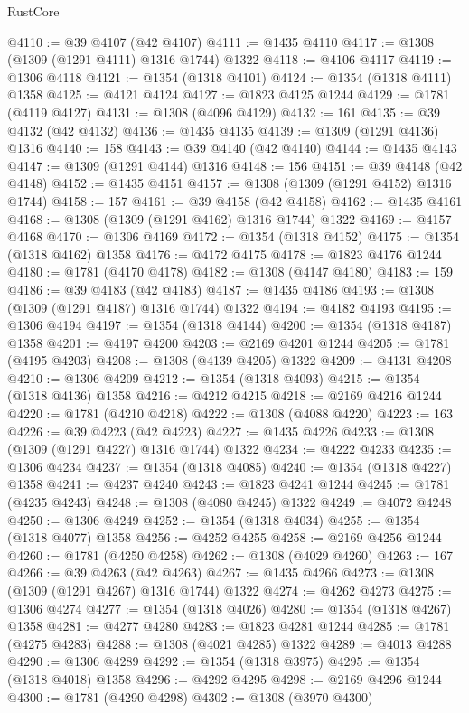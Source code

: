 \begin{lexlean}{RustCore}
\begin{coremodule}
@4110 := @39 @4107 (@42 @4107)
@4111 := @1435 @4110
@4117 := @1308 (@1309 (@1291 @4111) @1316 @1744) @1322
@4118 := @4106 @4117
@4119 := @1306 @4118
@4121 := @1354 (@1318 @4101)
@4124 := @1354 (@1318 @4111) @1358
@4125 := @4121 @4124
@4127 := @1823 @4125 @1244
@4129 := @1781 (@4119 @4127)
@4131 := @1308 (@4096 @4129)
@4132 := 161
@4135 := @39 @4132 (@42 @4132)
@4136 := @1435 @4135
@4139 := @1309 (@1291 @4136) @1316
@4140 := 158
@4143 := @39 @4140 (@42 @4140)
@4144 := @1435 @4143
@4147 := @1309 (@1291 @4144) @1316
@4148 := 156
@4151 := @39 @4148 (@42 @4148)
@4152 := @1435 @4151
@4157 := @1308 (@1309 (@1291 @4152) @1316 @1744)
@4158 := 157
@4161 := @39 @4158 (@42 @4158)
@4162 := @1435 @4161
@4168 := @1308 (@1309 (@1291 @4162) @1316 @1744) @1322
@4169 := @4157 @4168
@4170 := @1306 @4169
@4172 := @1354 (@1318 @4152)
@4175 := @1354 (@1318 @4162) @1358
@4176 := @4172 @4175
@4178 := @1823 @4176 @1244
@4180 := @1781 (@4170 @4178)
@4182 := @1308 (@4147 @4180)
@4183 := 159
@4186 := @39 @4183 (@42 @4183)
@4187 := @1435 @4186
@4193 := @1308 (@1309 (@1291 @4187) @1316 @1744) @1322
@4194 := @4182 @4193
@4195 := @1306 @4194
@4197 := @1354 (@1318 @4144)
@4200 := @1354 (@1318 @4187) @1358
@4201 := @4197 @4200
@4203 := @2169 @4201 @1244
@4205 := @1781 (@4195 @4203)
@4208 := @1308 (@4139 @4205) @1322
@4209 := @4131 @4208
@4210 := @1306 @4209
@4212 := @1354 (@1318 @4093)
@4215 := @1354 (@1318 @4136) @1358
@4216 := @4212 @4215
@4218 := @2169 @4216 @1244
@4220 := @1781 (@4210 @4218)
@4222 := @1308 (@4088 @4220)
@4223 := 163
@4226 := @39 @4223 (@42 @4223)
@4227 := @1435 @4226
@4233 := @1308 (@1309 (@1291 @4227) @1316 @1744) @1322
@4234 := @4222 @4233
@4235 := @1306 @4234
@4237 := @1354 (@1318 @4085)
@4240 := @1354 (@1318 @4227) @1358
@4241 := @4237 @4240
@4243 := @1823 @4241 @1244
@4245 := @1781 (@4235 @4243)
@4248 := @1308 (@4080 @4245) @1322
@4249 := @4072 @4248
@4250 := @1306 @4249
@4252 := @1354 (@1318 @4034)
@4255 := @1354 (@1318 @4077) @1358
@4256 := @4252 @4255
@4258 := @2169 @4256 @1244
@4260 := @1781 (@4250 @4258)
@4262 := @1308 (@4029 @4260)
@4263 := 167
@4266 := @39 @4263 (@42 @4263)
@4267 := @1435 @4266
@4273 := @1308 (@1309 (@1291 @4267) @1316 @1744) @1322
@4274 := @4262 @4273
@4275 := @1306 @4274
@4277 := @1354 (@1318 @4026)
@4280 := @1354 (@1318 @4267) @1358
@4281 := @4277 @4280
@4283 := @1823 @4281 @1244
@4285 := @1781 (@4275 @4283)
@4288 := @1308 (@4021 @4285) @1322
@4289 := @4013 @4288
@4290 := @1306 @4289
@4292 := @1354 (@1318 @3975)
@4295 := @1354 (@1318 @4018) @1358
@4296 := @4292 @4295
@4298 := @2169 @4296 @1244
@4300 := @1781 (@4290 @4298)
@4302 := @1308 (@3970 @4300)

\end{coremodule}
\end{lexlean}

